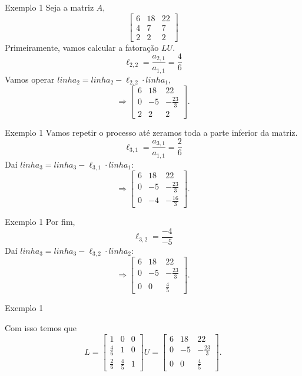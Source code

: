 \documentclass[]{beamer}
\begin{document}
\begin{frame}{Exemplo 1}
Seja a matriz $A,$
$$\begin{bmatrix}6&18&22\\ 4&7&7\\ 2&2&2\end{bmatrix}$$
Primeiramente, vamos calcular a fatoração $LU.$
$$\ell_{2,2} = \dfrac{a_{2,1}}{a_{1,1}}= \dfrac{4}{6}$$
Vamos operar $linha_2 = linha_2 - \ell_{2,2} \cdot linha_1,$
$$\Rightarrow \begin{bmatrix}6&18&22\\ 0&-5&-\frac{23}{3}\\ 2&2&2\end{bmatrix}.$$
\end{frame}

\begin{frame}{Exemplo 1}
Vamos repetir o processo até zeramos toda a parte inferior da matriz.
$$\ell_{3,1} = \dfrac{a_{3,1}}{a_{1,1}} = \dfrac{2}{6}$$
Daí $linha_3 = linha_3 - \ell_{3,1} \cdot linha_1: $
$$\Rightarrow \begin{bmatrix}6&18&22\\ 0&-5&-\frac{23}{3}\\ 0&-4&-\frac{16}{3}\end{bmatrix}.$$
\end{frame}

\begin{frame}{Exemplo 1}
Por fim, $$\ell_{3,2}  = \dfrac{-4}{-5}$$
Daí $linha_3 = linha_3 - \ell_{3,2} \cdot linha_2: $
$$\Rightarrow \begin{bmatrix}6&18&22\\ 0&-5&-\frac{23}{3}\\ 0&0&\frac{4}{5}\end{bmatrix}.$$
\end{frame}

\begin{frame}{Exemplo 1}

Com isso temos que $$L=\begin{bmatrix}1&0&0\\ \frac{4}{6}&1&0\\ \frac{2}{6}&\frac{4}{5}&1\end{bmatrix} U = \begin{bmatrix}6&18&22\\ 0&-5&-\frac{23}{3}\\ 0&0&\frac{4}{5}\end{bmatrix}.$$ 
\end{frame}
\end{document}
